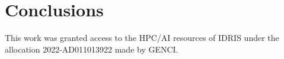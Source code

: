 \documentclass{aa}
\begin{document}
\section{Conclusions}
\begin{acknowledgements}
This work was granted access to the HPC/AI resources of IDRIS under the allocation 2022-AD011013922 made by GENCI.
\end{acknowledgements}
 
\end{document}
